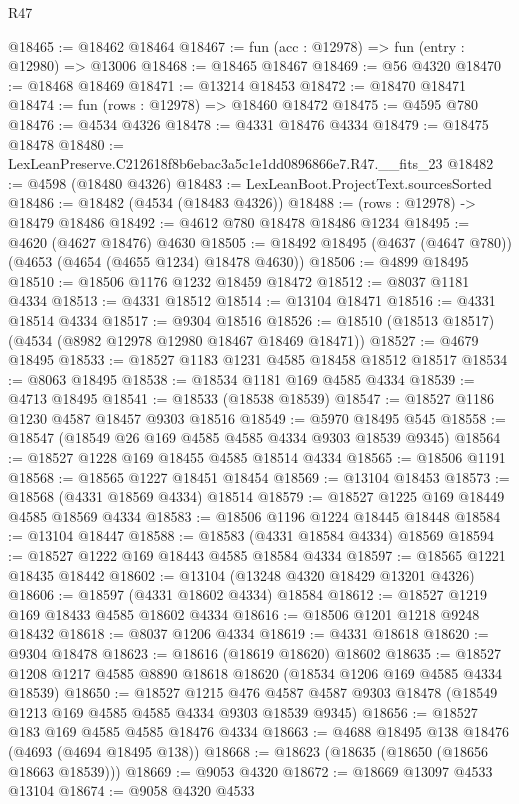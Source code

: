 \begin{lexlean}{R47}
\begin{coremodule}
@18465 := @18462 @18464
@18467 := fun (acc : @12978) => fun (entry : @12980) => @13006
@18468 := @18465 @18467
@18469 := @56 @4320
@18470 := @18468 @18469
@18471 := @13214 @18453
@18472 := @18470 @18471
@18474 := fun (rows : @12978) => @18460 @18472
@18475 := @4595 @780
@18476 := @4534 @4326
@18478 := @4331 @18476 @4334
@18479 := @18475 @18478
@18480 := LexLeanPreserve.C212618f8b6ebac3a5c1e1dd0896866e7.R47.__fits_23
@18482 := @4598 (@18480 @4326)
@18483 := LexLeanBoot.ProjectText.sourcesSorted
@18486 := @18482 (@4534 (@18483 @4326))
@18488 := (rows : @12978) -> @18479 @18486
@18492 := @4612 @780 @18478 @18486 @1234
@18495 := @4620 (@4627 @18476) @4630
@18505 := @18492 @18495 (@4637 (@4647 @780)) (@4653 (@4654 (@4655 @1234) @18478 @4630))
@18506 := @4899 @18495
@18510 := @18506 @1176 @1232 @18459 @18472
@18512 := @8037 @1181 @4334
@18513 := @4331 @18512
@18514 := @13104 @18471
@18516 := @4331 @18514 @4334
@18517 := @9304 @18516
@18526 := @18510 (@18513 @18517) (@4534 (@8982 @12978 @12980 @18467 @18469 @18471))
@18527 := @4679 @18495
@18533 := @18527 @1183 @1231 @4585 @18458 @18512 @18517
@18534 := @8063 @18495
@18538 := @18534 @1181 @169 @4585 @4334
@18539 := @4713 @18495
@18541 := @18533 (@18538 @18539)
@18547 := @18527 @1186 @1230 @4587 @18457 @9303 @18516
@18549 := @5970 @18495 @545
@18558 := @18547 (@18549 @26 @169 @4585 @4585 @4334 @9303 @18539 @9345)
@18564 := @18527 @1228 @169 @18455 @4585 @18514 @4334
@18565 := @18506 @1191
@18568 := @18565 @1227 @18451 @18454
@18569 := @13104 @18453
@18573 := @18568 (@4331 @18569 @4334) @18514
@18579 := @18527 @1225 @169 @18449 @4585 @18569 @4334
@18583 := @18506 @1196 @1224 @18445 @18448
@18584 := @13104 @18447
@18588 := @18583 (@4331 @18584 @4334) @18569
@18594 := @18527 @1222 @169 @18443 @4585 @18584 @4334
@18597 := @18565 @1221 @18435 @18442
@18602 := @13104 (@13248 @4320 @18429 @13201 @4326)
@18606 := @18597 (@4331 @18602 @4334) @18584
@18612 := @18527 @1219 @169 @18433 @4585 @18602 @4334
@18616 := @18506 @1201 @1218 @9248 @18432
@18618 := @8037 @1206 @4334
@18619 := @4331 @18618
@18620 := @9304 @18478
@18623 := @18616 (@18619 @18620) @18602
@18635 := @18527 @1208 @1217 @4585 @8890 @18618 @18620 (@18534 @1206 @169 @4585 @4334 @18539)
@18650 := @18527
    @1215
    @476
    @4587
    @4587
    @9303
    @18478
    (@18549 @1213 @169 @4585 @4585 @4334 @9303 @18539 @9345)
@18656 := @18527 @183 @169 @4585 @4585 @18476 @4334
@18663 := @4688 @18495 @138 @18476 (@4693 (@4694 @18495 @138))
@18668 := @18623 (@18635 (@18650 (@18656 @18663 @18539)))
@18669 := @9053 @4320
@18672 := @18669 @13097 @4533 @13104
@18674 := @9058 @4320 @4533

\end{coremodule}
\end{lexlean}
